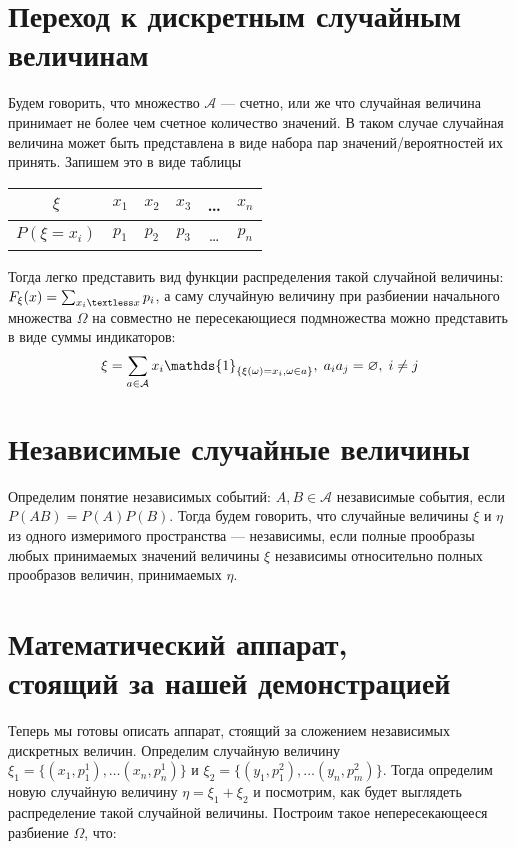 \documentclass{article}
\begin{document}
\begin{multicols}{2}
    \section{Переход к дискретным случайным величинам}
        Будем говорить, что множество $\mathcal{A}$ — счетно, или же что случайная величина принимает не более чем счетное количество значений. В таком случае случайная величина может быть представлена в виде набора пар значений/вероятностей их принять. Запишем это в виде таблицы 

        \begin{center}
            \begin{tabular}{ c|c|c|c|c|c } 
                 $\xi$ & $x_1$ & $x_2$ & $x_3$ & \ldots & $x_n$\\
                 \hline
                 $P(\xi = x_i)$ & $p_1$ & $p_2$ & $p_3$ & \ldots & $p_n$ \\
            \end{tabular}
        \end{center}

        Тогда легко представить вид функции распределения такой случайной величины: $F_{\xi}(x) = \sum_{x_i \textless x}p_i$, а саму случайную величину при разбиении начального множества $\Omega$ на совместно не пересекающиеся подмножества можно представить в виде суммы индикаторов: $$\xi = \sum_{a \in \mathcal{A}}{x_i \mathds{1}_{\{\xi(\omega) = x_i, \omega \in a\}}}, \hspace{0.1cm} a_ia_j = \varnothing, \hspace{0.1cm} i \neq j$$

\section{Независимые случайные величины}
    Определим понятие независимых событий: $A, B \in \mathcal{A}$ независимые события, если $P(AB)=P(A)P(B)$. Тогда будем говорить, что случайные величины $\xi$ и $\eta$ из одного измеримого пространства — независимы, если полные прообразы любых принимаемых значений величины $\xi$ независимы относительно полных прообразов величин, принимаемых $\eta$. 

\section{Математический аппарат,\\ стоящий за нашей демонстрацией}
    Теперь мы готовы описать аппарат, стоящий за сложением независимых дискретных величин. Определим случайную величину $\xi_1 = \{(x_1, p_1^1), \ldots (x_n, p_n^1)\}$ и $\xi_2 = \{(y_1, p_1^2), \ldots (y_n, p_m^2)\}$. Тогда определим новую случайную величину $\eta = \xi_1 + \xi_2$ и посмотрим, как будет выглядеть распределение такой случайной величины. Построим такое непересекающееся разбиение $\Omega$, что:


\end{multicols}
\end{document}
